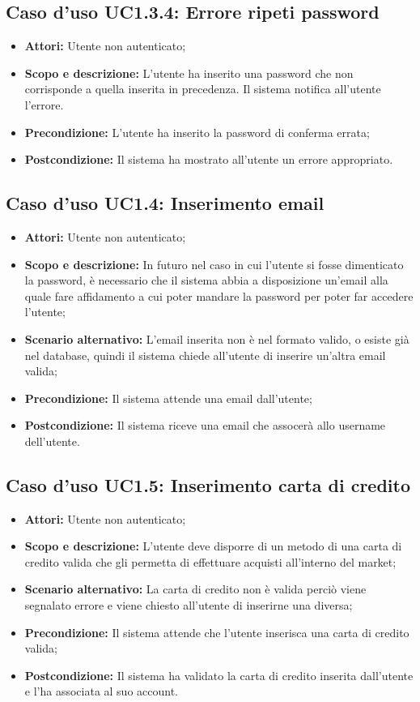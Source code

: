 \documentclass[12pt,a4paper,titlepage]{article}
\begin{document}
	\subsection{Caso d'uso UC1.3.4: Errore ripeti password}
	\label{UC1.3.4}
	\begin{itemize}
		\item \textbf{Attori: }Utente non autenticato;
		\item \textbf{Scopo e descrizione: }L'utente ha inserito una password che non corrisponde a quella inserita in precedenza. Il sistema notifica all'utente l'errore.
		\item \textbf{Precondizione: }L'utente ha inserito la password di conferma errata;
		\item \textbf{Postcondizione: }Il sistema ha mostrato all'utente un errore appropriato.
	\end{itemize}
	\subsection{Caso d'uso UC1.4: Inserimento email}
	\label{UC1.4}
	\begin{itemize}
		\item \textbf{Attori: }Utente non autenticato;
		\item \textbf{Scopo e descrizione: }In futuro nel caso in cui l'utente si fosse dimenticato la password, è necessario che il sistema abbia a disposizione un'email alla quale fare affidamento a cui poter mandare la password per poter far accedere l'utente;
		\item \textbf{Scenario alternativo: }L'email inserita non è nel formato valido, o esiste già nel database, quindi il sistema chiede all'utente di inserire un'altra email valida;
		\item \textbf{Precondizione: }Il sistema attende una email dall'utente;
		\item \textbf{Postcondizione: }Il sistema riceve una email che assocerà allo username dell'utente.
	\end{itemize}
	\subsection{Caso d'uso UC1.5: Inserimento carta di credito}
	\label{UC1.5}
	\begin{itemize}
		\item \textbf{Attori: }Utente non autenticato;
		\item \textbf{Scopo e descrizione: }L'utente deve disporre di un metodo di una carta di credito valida che gli permetta di effettuare acquisti all'interno del market;
		\item \textbf{Scenario alternativo: }La carta di credito non è valida perciò viene segnalato errore e viene chiesto all'utente di inserirne una diversa;
		\item \textbf{Precondizione: }Il sistema attende che l'utente inserisca una carta di credito valida;
		\item \textbf{Postcondizione: }Il sistema ha validato la carta di credito inserita dall'utente e l'ha associata al suo account.
	\end{itemize}
\end{document}
